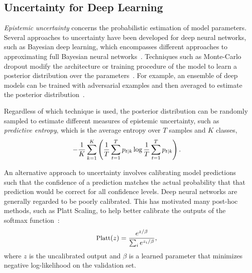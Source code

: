 \documentclass[letterpaper]{article} %
\begin{document}
    \subsection{Uncertainty for Deep Learning}
        \textit{Epistemic uncertainty} concerns the probabilistic estimation of model parameters. 
        Several approaches to uncertainty have been developed for deep neural networks, such as Bayesian deep learning, which encompasses different approaches to approximating full Bayesian neural networks~\cite{Gal2016Uncertainty}. 
        Techniques such as Monte-Carlo dropout modify the architecture or training procedure of the model to learn a posterior distribution over the parameters~\cite{pmlr-v48-gal16}.
        For example, an ensemble of deep models can be trained with adversarial examples and then averaged to estimate the posterior distribution~\cite{NIPS2017_9ef2ed4b}.
        
        Regardless of which technique is used, the posterior distribution can be randomly sampled to estimate different measures of epistemic uncertainty, such as \textit{predictive entropy}, which is the average entropy over $T$ samples and $K$ classes,
        \begin{equation}
            \label{eq:entropy}
            \small
                -\frac{1}{K} \sum_{k=1}^K \left(\frac{1}{T} \sum_{t=1}^T p_{t \mid k} \log \frac{1}{T} \sum_{t=1}^T p_{t \mid k}\right).
        \end{equation}
        
        
        An alternative approach to uncertainty involves calibrating model predictions such that the confidence of a prediction matches the actual probability that that prediction would be correct for all confidence levels. 
        Deep neural networks are generally regarded to be poorly calibrated.
        This has motivated many post-hoc methods, such as Platt Scaling, to help better calibrate the outputs of the softmax function~\cite{pmlr-v70-guo17a}:
        \begin{equation}
            \label{eq:platt}
            \small
            \textrm{Platt}(z) = \frac{e^{z/\beta}}{\sum_i e^{z_i/\beta}},
        \end{equation}
        where $z$ is the uncalibrated output and $\beta$ is a learned parameter that minimizes negative log-likelihood on the validation set.
        
\end{document}
